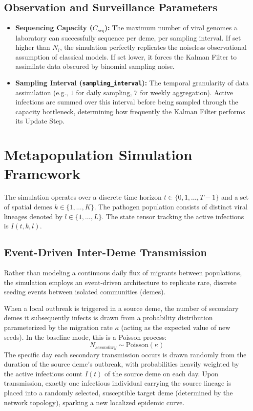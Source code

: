 \documentclass[12pt]{article}
\begin{document}
\subsection{Observation and Surveillance Parameters}
\begin{itemize}
    \item \textbf{Sequencing Capacity ($C_{seq}$):} The maximum number of viral genomes a laboratory can successfully sequence per deme, per sampling interval. If set higher than $N_i$, the simulation perfectly replicates the noiseless observational assumption of classical models. If set lower, it forces the Kalman Filter to assimilate data obscured by binomial sampling noise.
    \item \textbf{Sampling Interval (\texttt{sampling\_interval}):} The temporal granularity of data assimilation (e.g., $1$ for daily sampling, $7$ for weekly aggregation). Active infections are summed over this interval before being sampled through the capacity bottleneck, determining how frequently the Kalman Filter performs its Update Step.
\end{itemize}

\section{Metapopulation Simulation Framework}
The simulation operates over a discrete time horizon $t \in \{0, 1, \dots, T-1\}$ and a set of spatial demes $k \in \{1, \dots, K\}$. The pathogen population consists of distinct viral lineages denoted by $l \in \{1, \dots, L\}$. The state tensor tracking the active infections is $I(t, k, l)$.

\subsection{Event-Driven Inter-Deme Transmission}
Rather than modeling a continuous daily flux of migrants between populations, the simulation employs an event-driven architecture to replicate rare, discrete seeding events between isolated communities (demes). 

When a local outbreak is triggered in a source deme, the number of secondary demes it subsequently infects is drawn from a probability distribution parameterized by the migration rate $\kappa$ (acting as the expected value of new seeds). In the baseline mode, this is a Poisson process:
\begin{equation}
    N_{secondary} \sim \text{Poisson}(\kappa)
\end{equation}
The specific day each secondary transmission occurs is drawn randomly from the duration of the source deme's outbreak, with probabilities heavily weighted by the active infectious count $I(t)$ of the source deme on each day. Upon transmission, exactly one infectious individual carrying the source lineage is placed into a randomly selected, susceptible target deme (determined by the network topology), sparking a new localized epidemic curve.
\end{document}

